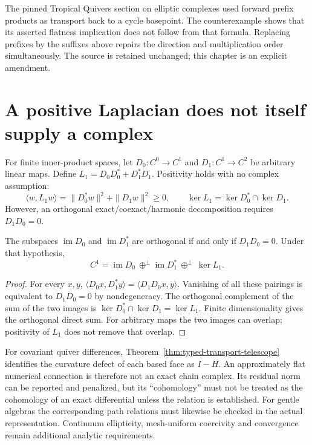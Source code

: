 The pinned Tropical Quivers section on elliptic complexes used forward
prefix products as transport back to a cycle basepoint. The counterexample
shows that its asserted flatness implication does not follow from that
formula. Replacing prefixes by the suffixes above repairs the direction
and multiplication order simultaneously. The source is retained unchanged;
this chapter is an explicit amendment.

\section{A positive Laplacian does not itself supply a complex}

For finite inner-product spaces, let $D_0:C^0\to C^1$ and
$D_1:C^1\to C^2$ be arbitrary linear maps. Define
$L_1=D_0D_0^*+D_1^*D_1$. Positivity holds with no complex assumption:
\[
 \langle w,L_1w\rangle=\|D_0^*w\|^2+\|D_1w\|^2\ge0,
 \qquad \ker L_1=\ker D_0^*\cap\ker D_1.
\]
However, an orthogonal exact/coexact/harmonic decomposition requires
$D_1D_0=0$.

\begin{proposition}
The subspaces $\operatorname{im}D_0$ and $\operatorname{im}D_1^*$ are
orthogonal if and only if $D_1D_0=0$. Under that hypothesis,
\[
 C^1=\operatorname{im}D_0\ \mathbin{\oplus^{\perp}}
 \operatorname{im}D_1^*\ \mathbin{\oplus^{\perp}}\ \ker L_1.
\]
\end{proposition}
\begin{proof}
For every $x,y$,
$\langle D_0x,D_1^*y\rangle=\langle D_1D_0x,y\rangle$.
Vanishing of all these pairings is equivalent to $D_1D_0=0$ by
nondegeneracy. The orthogonal complement of the sum of the two images is
$\ker D_0^*\cap\ker D_1=\ker L_1$. Finite dimensionality gives the
orthogonal direct sum. For arbitrary maps the two images can overlap;
positivity of $L_1$ does not remove that overlap.
\end{proof}

For covariant quiver differences, Theorem~\ref{thm:typed-transport-telescope}
identifies the curvature defect of each based face as $I-H$. An
approximately flat numerical connection is therefore not an exact chain
complex. Its residual norm can be reported and penalized, but its
``cohomology'' must not be treated as the cohomology of an exact differential
unless the relation is established. For gentle algebras the corresponding
path relations must likewise be checked in the actual representation.
Continuum ellipticity, mesh-uniform coercivity and convergence remain
additional analytic requirements.

